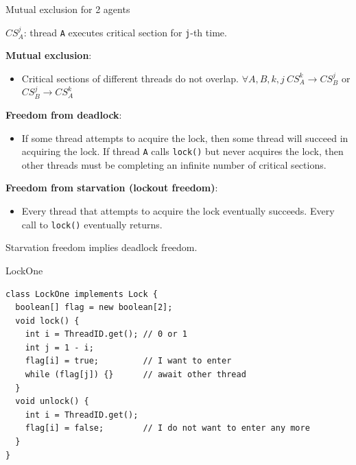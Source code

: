 \begin{frame}{Mutual exclusion for 2 agents}

$CS_{A}^{j}$: thread \texttt{A} executes critical section for \texttt{j}-th time.

\pause

\textbf{Mutual exclusion}:
\begin{itemize}
  \item Critical sections of different threads do not overlap. \pause
   $\forall A, B, k, j \ CS_{A}^{k} \rightarrow CS_{B}^{j}$ or $CS_{B}^{j} \rightarrow CS_{A}^{k}$
\end{itemize}

\pause
\textbf{Freedom from deadlock}:
\begin{itemize}
  \item If some thread attempts to acquire the lock, then some thread will succeed in acquiring the lock. If thread \texttt{A} calls \texttt{lock()}
  but never acquires the lock, then other threads must be completing an infinite number of critical sections.
\end{itemize}

\pause

\textbf{Freedom from starvation (lockout freedom)}:
\begin{itemize}
  \item Every thread that attempts to acquire the lock eventually succeeds. Every call to \texttt{lock()} eventually returns.
\end{itemize}

\pause

\begin{theorem}
  Starvation freedom implies deadlock freedom.
\end{theorem} 
\end{frame}




\begin{frame}[fragile]{LockOne}

\begin{verbatim}
class LockOne implements Lock {
  boolean[] flag = new boolean[2];
  void lock() {
    int i = ThreadID.get(); // 0 or 1
    int j = 1 - i;
    flag[i] = true;         // I want to enter
    while (flag[j]) {}      // await other thread
  }
  void unlock() {
    int i = ThreadID.get();  
    flag[i] = false;        // I do not want to enter any more
  }
}
\end{verbatim}
\end{frame}


